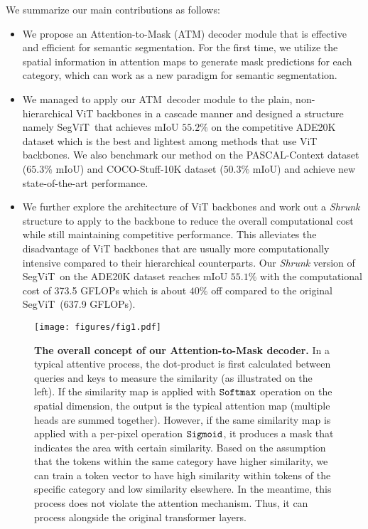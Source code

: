\documentclass{article}
\def\atm{ATM}
\def\seg{SegViT}
\begin{document}
We summarize our main contributions as follows:

\begin{itemize}
    \item We propose an Attention-to-Mask (\atm) decoder module that is effective and efficient for semantic segmentation. For the first time, we utilize the spatial information in attention maps to generate mask      predictions for each category, which can work as a new paradigm for semantic segmentation.
    
    \item We managed to apply our \atm\ decoder module to the plain, non-hierarchical ViT backbones in a cascade manner and designed a structure namely \seg\ that achieves  mIoU $55.2\%$  on the competitive ADE20K dataset which is the best and lightest among methods that use ViT backbones. We also benchmark our method on the PASCAL-Context dataset ($65.3\%$ mIoU) and COCO-Stuff-10K dataset ($50.3\%$ mIoU) and achieve new state-of-the-art performance.
    
    \item  We further explore the architecture of ViT backbones and work out a \emph{Shrunk} structure
    to apply to the backbone to reduce the
    overall computational cost while still maintaining competitive performance. This alleviates the disadvantage of ViT backbones that are usually more computationally intensive compared to their hierarchical counterparts. Our \emph{Shrunk} version of \seg\ on the ADE20K dataset reaches mIoU  $55.1\%$ with the computational cost of 373.5 GFLOPs which is about $40\%$ off compared to the original \seg\ (637.9 GFLOPs).
\end{itemize}


\begin{figure}[t]
    \centering
    \texttt{[image: figures/fig1.pdf]}
    \caption{\textbf{The overall concept of 
    our Attention-to-Mask decoder.} 
    In a typical attentive process, the dot-product is first 
    calculated 
    between queries and keys to measure the similarity (as illustrated on the left).
    If the similarity map is applied with ${\tt Softmax}$ operation on the spatial dimension, the output is the typical attention map (multiple heads are summed together).  
    However, if the same similarity map is applied with a per-pixel operation ${\tt Sigmoid}$, it
    produces a mask that indicates the area with certain similarity. 
    Based on the assumption that the tokens within the same category have higher similarity, we can train a token vector to have high similarity within tokens of the specific category and low similarity elsewhere. 
    In the meantime, this process does not violate the attention mechanism.
    Thus, it can process alongside the original transformer layers.
    }
    \label{fig:attn_vs_mask}
\end{figure}
\end{document}
